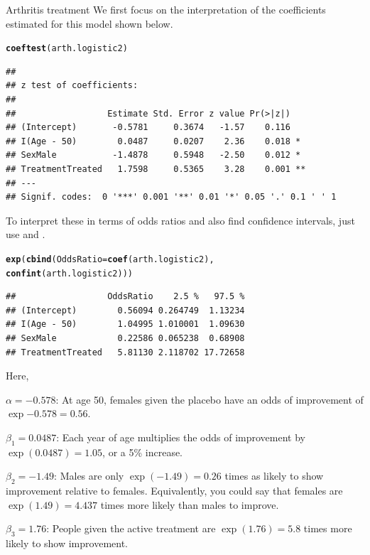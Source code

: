 \documentclass[11pt]{book}\usepackage[]{graphicx}\usepackage[]{color}
\makeatletter
\newcommand{\hlstd}[1]{\textcolor[rgb]{0.345,0.345,0.345}{#1}}%
\newcommand{\hlkwc}[1]{\textcolor[rgb]{0.333,0.667,0.333}{#1}}%
\newcommand{\hlkwd}[1]{\textcolor[rgb]{0.737,0.353,0.396}{\textbf{#1}}}%
\newenvironment{kframe}{%
 \def\at@end@of@kframe{}%
 \ifinner\ifhmode%
  \def\at@end@of@kframe{\end{minipage}}%
  \begin{minipage}{\columnwidth}%
 \fi\fi%
 \def\FrameCommand##1{\hskip\@totalleftmargin \hskip-\fboxsep
 \colorbox{shadecolor}{##1}\hskip-\fboxsep
     \hskip-\linewidth \hskip-\@totalleftmargin \hskip\columnwidth}%
 \MakeFramed {\advance\hsize-\width
   \@totalleftmargin\z@ \linewidth\hsize
   \@setminipage}}%
 {\par\unskip\endMakeFramed%
 \at@end@of@kframe}
\newenvironment{knitrout}{}{} %
\renewenvironment{knitrout}{\small\renewcommand{\baselinestretch}{.85}}{} %
\makeatother
\begin{document}
\begin{Example}{Arthritis treatment}
We first focus on the interpretation of the coefficients estimated for this model
shown below.
\begin{knitrout}
\color{fgcolor}\begin{kframe}
\begin{alltt}
\hlkwd{coeftest}\hlstd{(arth.logistic2)}
\end{alltt}
\begin{verbatim}
## 
## z test of coefficients:
## 
##                  Estimate Std. Error z value Pr(>|z|)   
## (Intercept)       -0.5781     0.3674   -1.57    0.116   
## I(Age - 50)        0.0487     0.0207    2.36    0.018 * 
## SexMale           -1.4878     0.5948   -2.50    0.012 * 
## TreatmentTreated   1.7598     0.5365    3.28    0.001 **
## ---
## Signif. codes:  0 '***' 0.001 '**' 0.01 '*' 0.05 '.' 0.1 ' ' 1
\end{verbatim}
\end{kframe}
\end{knitrout}
To interpret these in terms of odds ratios and also find confidence intervals,
just use  and .
\begin{knitrout}
\color{fgcolor}\begin{kframe}
\begin{alltt}
\hlkwd{exp}\hlstd{(}\hlkwd{cbind}\hlstd{(}\hlkwc{OddsRatio}\hlstd{=}\hlkwd{coef}\hlstd{(arth.logistic2),}
          \hlkwd{confint}\hlstd{(arth.logistic2)))}
\end{alltt}
\begin{verbatim}
##                  OddsRatio    2.5 %   97.5 %
## (Intercept)        0.56094 0.264749  1.13234
## I(Age - 50)        1.04995 1.010001  1.09630
## SexMale            0.22586 0.065238  0.68908
## TreatmentTreated   5.81130 2.118702 17.72658
\end{verbatim}
\end{kframe}
\end{knitrout}
Here,
\begin{itemize*}
  \item $\alpha = -0.578$: At age 50, females given the placebo have an odds of improvement
  of  $\exp{-0.578} = 0.56$.
  \item $\beta_1 = 0.0487$: Each year of age multiplies the odds of improvement by
  $\exp(0.0487) = 1.05$, or a 5\% increase.
  \item $\beta_2 = -1.49$: Males are only $\exp(-1.49) = 0.26$ times as likely to show
  improvement relative to females.  Equivalently, you could say that females are
  $\exp(1.49) = 4.437$ times more likely than males to improve.
  \item $\beta_3 = 1.76$: People given the active treatment are $\exp(1.76) = 5.8$
  times more likely to show improvement.
\end{itemize*}


\end{Example}
\end{document}
